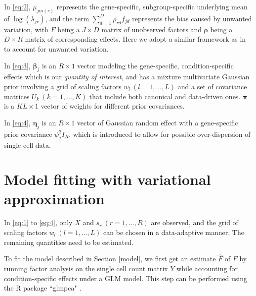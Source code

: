 \documentclass[onefignum,onetabnum,oneeqnum,final]{siamart190516}
\begin{document}
In \eqref{eq:2},  $\mu_{jm(r)}$ represents the gene-specific, subgroup-specific underlying mean of $\log(\lambda_{jr})$,  and the term $\sum_{d=1}^D \rho_{rd} f_{jd}$ represents the bias caused by unwanted variation, with $F$ being a $J \times D$ matrix of unobserved factors and $\bm{\rho}$ being a $D \times R$ matrix of corresponding effects. Here we adopt a similar framework as in \cite{gerard2020empirical} to account for unwanted variation.  

In \eqref{eq:3}, $\bm{\beta}_j$ is an $R \times 1$ vector modeling the gene-specific, condition-specific effects which is our \textit{quantity of interest}, and has a mixture multivariate Gaussian prior involving a grid of scaling factors $w_l \: (l=1, \dots, L)$ and a set of covariance matrices $U_k \: (k=1, \dots, K)$ that include both canonical and data-driven ones.  $\bm{\pi} $ is a $KL \times 1$ vector of weights for different prior covariances.

In \eqref{eq:4}, $\bm{\eta}_j$ is an $R \times 1$ vector of Gaussian random effect with a gene-specific prior covariance $\psi_j^2 I_R$, which is introduced to allow for possible over-dispersion of single cell data.  


\section{Model fitting with variational approximation} \label{variational}
In \eqref{eq:1} to \eqref{eq:4}, only $X$ and $s_r \: (r=1, \dots, R)$ are observed, and the grid of scaling factors $w_l \: (l=1, \dots, L)$ can be chosen in a data-adaptive manner.  The remaining quantities need to be estimated. 

To fit the model described in Section \ref{model}, we first get an estimate $\hat{F}$ of $F$ by running factor analysis on the single cell count matrix $Y$ while accounting for condition-specific effects under a GLM model. This step can be performed using the R package ``glmpca" \cite{townes2019feature}.
\end{document}
